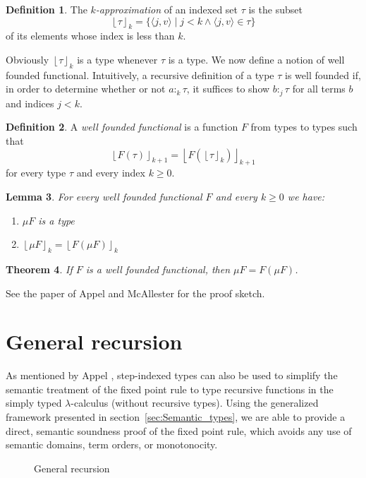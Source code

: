 \documentclass[10pt,a4paper,final,twocolumn]{article}
\theoremstyle{definition}
\newtheorem{definition}{Definition}
\theoremstyle{plain}
\newtheorem{lemma}[definition]{Lemma}
\newtheorem{theorem}[definition]{Theorem}
\newcommand{\app}[2]{\ensuremath{{#1}\,{#2}}}
\newcommand{\fix}[1]{\ensuremath{\mathsf{fix}\,{#1}}}
\newcommand{\pair}[1]{\ensuremath{\langle{#1}\rangle}}
\newcommand{\floor}[1]{\ensuremath{\left\lfloor{#1}\right\rfloor}}
\begin{document}
\begin{definition} \label{def:Approximation}
  The \emph{$k$-approximation} of an indexed set $\tau$ is the subset
  \[ \floor{\tau}_k = \{ \pair{j,v} \mid j < k \wedge \pair{j,v} \in \tau \} \]
  of its elements whose index is less than $k$.
\end{definition}

Obviously $\floor{\tau}_k$ is a type whenever $\tau$ is a type. We now define a notion of well founded
functional. Intuitively, a recursive definition of a type $\tau$ is well founded if, in order to determine
whether or not \mbox{$a :_k \tau$}, it suffices to show \mbox{$b :_j \tau$} for all terms $b$ and indices
\mbox{$j < k$}.

\begin{definition}
  A \emph{well founded functional} is a function $F$ from types to types such that
  \[\floor{F\left(\tau\right)}_{k+1} = \floor{F\left(\floor{\tau}_k\right)}_{k+1}\]
  for every type $\tau$ and every index $k \ge 0$.
\end{definition}

\begin{lemma}
  For every well founded functional $F$ and every $k \ge 0$ we have:
  \begin{enumerate}
  \item $\mu F$ is a type
  \item $\floor{\mu F}_k = \floor{F \left(\mu F\right)}_k$
  \end{enumerate}
\end{lemma}

\begin{theorem} \label{thm:Well_founded_fixpoint}
  If $F$ is a well founded functional, then $\mu F = F(\mu F)$.
\end{theorem}

See the paper of Appel and McAllester \cite{AppelMcAllester01} for the proof sketch.


\section{General recursion}
\label{sec:General_recursion}


As mentioned by Appel \ETAL \cite{AppelMcAllester01}, step-indexed types can also be used to simplify the semantic
treatment of the fixed point rule to type recursive functions in the simply typed $\lambda$-calculus (without
recursive types).
Using the generalized framework presented in section~\ref{sec:Semantic_types}, we are able to provide a direct,
semantic soundness proof of the fixed point rule, which avoids any use of semantic domains, term orders, or
monotonocity.
\begin{figure}[tbh]
  \centering
  \caption{General recursion}
  \label{fig:General_recursion}
\end{figure}
\end{document}
